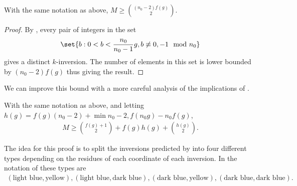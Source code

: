 \begin{prop}
    With the same notation as above, $M \geq \binom{(n_0-2)f(g)}{2}$.
\end{prop}

\begin{proof}
    By , every pair of integers in the set $$\set{b:0<b<\frac{n_0}{n_0-1}g, b \not \equiv 0,-1\mod n_0}$$ gives a distinct $k$-inversion. The number of elements in this set is lower bounded by $(n_0-2)f(g)$ thus giving the result.
\end{proof}

We can improve this bound with a more careful analysis of the implications of .

\begin{prop}\label{prop-oneOffNotGeneral}
    With the same notation as above, and letting $h(g) = f(g)(n_0-2) + \min{n_0-2,f(n_0g)-n_0f(g)}$,
    \begin{align*}
        M \geq \binom{f(g)+1}{2} + f(g)h(g) + \binom{h(g)}{2}.
    \end{align*}
\end{prop}

The idea for this proof is to split the inversions predicted by  into four different types depending on the residues of each coordinate of each inversion. In the notation of  these types are 
\begin{align*}
    (\text{light blue}, \text{yellow}),(\text{light blue}, \text{dark blue}),(\text{dark blue}, \text{yellow}),(\text{dark blue}, \text{dark blue}). 
\end{align*}


